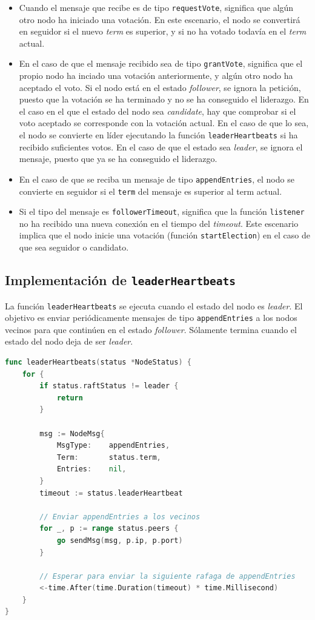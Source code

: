 \begin{itemize}
\item Cuando el mensaje que recibe es de tipo \texttt{requestVote}, significa que algún otro nodo ha iniciado una votación. En este escenario, el nodo se convertirá en seguidor si el nuevo \textit{term} es superior, y si no ha votado todavía en el \textit{term} actual.

\item En el caso de que el mensaje recibido sea de tipo \texttt{grantVote}, significa que el propio nodo ha inciado una votación anteriormente, y algún otro nodo ha aceptado el voto. Si el nodo está en el estado \textit{follower}, se ignora la petición, puesto que la votación se ha terminado y no se ha conseguido el liderazgo. En el caso en el que el estado del nodo sea \textit{candidate}, hay que comprobar si el voto aceptado se corresponde con la votación actual. En el caso de que lo sea, el nodo se convierte en líder ejecutando la función \texttt{leaderHeartbeats} si ha recibido suficientes votos. En el caso de que el estado sea \textit{leader}, se ignora el mensaje, puesto que ya se ha conseguido el liderazgo.

\item En el caso de que se reciba un mensaje de tipo \texttt{appendEntries}, el nodo se convierte en seguidor si el \texttt{term} del mensaje es superior al term actual.

\item Si el tipo del mensaje es \texttt{followerTimeout}, significa que la función \texttt{listener} no ha recibido una nueva conexión en el tiempo del \textit{timeout}. Este escenario implica que el nodo inicie una votación (función \texttt{startElection}) en el caso de que sea seguidor o candidato.
\end{itemize}

\subsection{Implementación de \texttt{leaderHeartbeats}}

La función \texttt{leaderHeartbeats} se ejecuta cuando el estado del nodo es \textit{leader}. El objetivo es enviar periódicamente mensajes de tipo \texttt{appendEntries} a los nodos vecinos para que continúen en el estado \textit{follower}. Sólamente termina cuando el estado del nodo deja de ser \textit{leader}. 

\begin{lstlisting}[language=go]
func leaderHeartbeats(status *NodeStatus) {
	for {
		if status.raftStatus != leader {
			return
		}

		msg := NodeMsg{
			MsgType:    appendEntries,
			Term:       status.term,
			Entries:    nil,
		}
		timeout := status.leaderHeartbeat
		
		// Enviar appendEntries a los vecinos
		for _, p := range status.peers {
			go sendMsg(msg, p.ip, p.port)
		}

		// Esperar para enviar la siguiente rafaga de appendEntries
		<-time.After(time.Duration(timeout) * time.Millisecond)
	}
}
\end{lstlisting}

